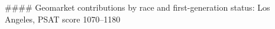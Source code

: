 #### Geomarket contributions by race and first-generation status: Los Angeles, PSAT score 1070–1180
